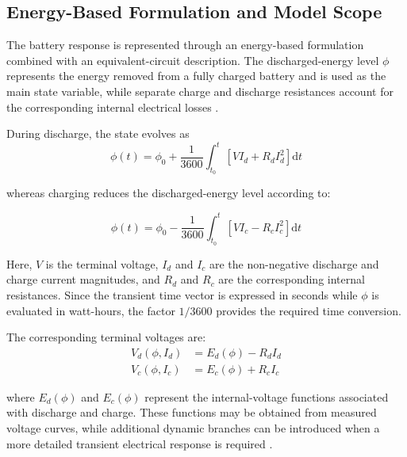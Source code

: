 \subsection{Energy-Based Formulation and Model Scope}
\label{subsec:battery_theoretical_basis}

The battery response is represented through an energy-based formulation
combined with an equivalent-circuit description. The discharged-energy level
\(\phi\) represents the energy removed from a fully charged battery and is
used as the main state variable, while separate charge and discharge
resistances account for the corresponding internal electrical losses
\cite{porras2018battery}.

During discharge, the state evolves as
\begin{equation}
    \phi(t)
    =
    \phi_0
    +
    \frac{1}{3600}
    \int_{t_0}^{t}
    \left[
        V I_d + R_d I_d^2
    \right]
    \mathrm{d}t
    \label{eq:battery_discharge_energy_ch8}
\end{equation}

whereas charging reduces the discharged-energy level according to:

\begin{equation}
    \phi(t)
    =
    \phi_0
    -
    \frac{1}{3600}
    \int_{t_0}^{t}
    \left[
        V I_c - R_c I_c^2
    \right]
    \mathrm{d}t
    \label{eq:battery_charge_energy_ch8}
\end{equation}

Here, $V$ is the terminal voltage, $I_d$ and $I_c$ are the non-negative
discharge and charge current magnitudes, and $R_d$ and $R_c$ are the
corresponding internal resistances. Since the transient time vector is
expressed in seconds while $\phi$ is evaluated in watt-hours, the factor
\(1/3600\) provides the required time conversion.

The corresponding terminal voltages are:
\begin{align}
    V_d(\phi,I_d)
    &=
    E_d(\phi)-R_d I_d
    \label{eq:battery_discharge_voltage_ch8}
    \\
    V_c(\phi,I_c)
    &=
    E_c(\phi)+R_c I_c
    \label{eq:battery_charge_voltage_ch8}
\end{align}

where $E_d(\phi)$ and $E_c(\phi)$ represent the internal-voltage functions
associated with discharge and charge. These functions may be obtained from
measured voltage curves, while additional dynamic branches can be introduced
when a more detailed transient electrical response is required
\cite{porras2018battery}.

